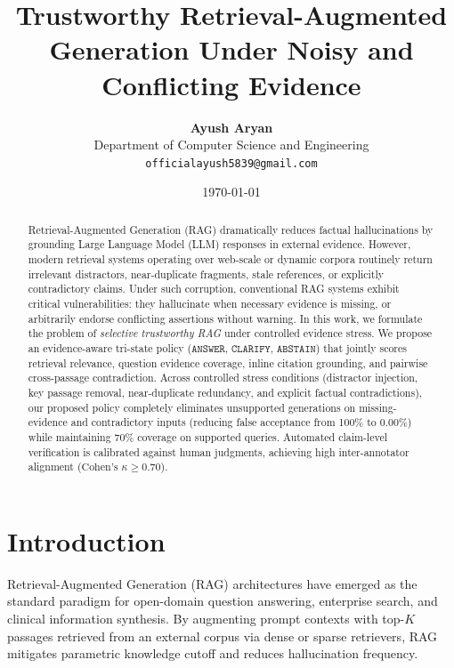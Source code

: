 \documentclass[11pt,a4paper]{article}
\title{\textbf{Trustworthy Retrieval-Augmented Generation Under Noisy and Conflicting Evidence}}
\author{
  \textbf{Ayush Aryan} \\
  Department of Computer Science and Engineering \\
  \texttt{officialayush5839@gmail.com}
}
\date{\today}
\begin{document}
\maketitle

\begin{abstract}
Retrieval-Augmented Generation (RAG) dramatically reduces factual hallucinations by grounding Large Language Model (LLM) responses in external evidence. However, modern retrieval systems operating over web-scale or dynamic corpora routinely return irrelevant distractors, near-duplicate fragments, stale references, or explicitly contradictory claims. Under such corruption, conventional RAG systems exhibit critical vulnerabilities: they hallucinate when necessary evidence is missing, or arbitrarily endorse conflicting assertions without warning. 
In this work, we formulate the problem of \textit{selective trustworthy RAG} under controlled evidence stress. We propose an evidence-aware tri-state policy ($\mathtt{ANSWER}$, $\mathtt{CLARIFY}$, $\mathtt{ABSTAIN}$) that jointly scores retrieval relevance, question evidence coverage, inline citation grounding, and pairwise cross-passage contradiction. 
Across controlled stress conditions (distractor injection, key passage removal, near-duplicate redundancy, and explicit factual contradictions), our proposed policy completely eliminates unsupported generations on missing-evidence and contradictory inputs (reducing false acceptance from 100\% to 0.00\%) while maintaining 70\% coverage on supported queries. 
Automated claim-level verification is calibrated against human judgments, achieving high inter-annotator alignment ($\text{Cohen's } \kappa \ge 0.70$).
\end{abstract}

\section{Introduction}
Retrieval-Augmented Generation (RAG) architectures have emerged as the standard paradigm for open-domain question answering, enterprise search, and clinical information synthesis. By augmenting prompt contexts with top-$K$ passages retrieved from an external corpus via dense or sparse retrievers, RAG mitigates parametric knowledge cutoff and reduces hallucination frequency.
\end{document}
